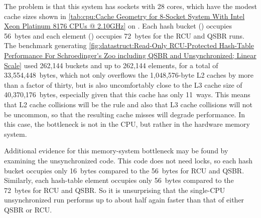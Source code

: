 The problem is that this system has sockets with 28 cores, which have
the modest cache sizes shown in
\cref{tab:cpu:Cache Geometry for 8-Socket System With Intel Xeon Platinum 8176 CPUs @ 2.10GHz}
on .
Each hash bucket () occupies 56~bytes and each
element () occupies 72~bytes for the RCU and QSBR runs.
The benchmark generating
\cref{fig:datastruct:Read-Only RCU-Protected Hash-Table Performance For Schroedinger's Zoo including QSBR and Unsynchronized; Linear Scale}
used 262,144 buckets and up to 262,144 elements, for a total of
33,554,448~bytes, which not only overflows the 1,048,576-byte L2 caches
by more than a factor of thirty, but is also uncomfortably close to the
L3 cache size of 40,370,176~bytes, especially given that this cache has
only 11~ways.
This means that L2 cache collisions will be the rule and also that L3
cache collisions will not be uncommon, so that the resulting cache misses
will degrade performance.
In this case, the bottleneck is not in the CPU, but rather in the hardware
memory system.

Additional evidence for this memory-system bottleneck may be found by
examining the unsynchronized code.
This code does not need locks, so each hash bucket occupies only 16~bytes
compared to the 56~bytes for RCU and QSBR\@.
Similarly, each hash-table element occupies only 56~bytes compared to the
72~bytes for RCU and QSBR\@.
So it is unsurprising that the single-CPU unsynchronized run performs up
to about half again faster than that of either QSBR or RCU\@.

